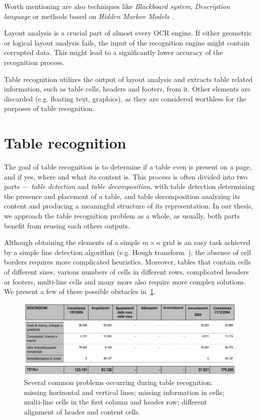 Worth mentioning are also techniques like \emph{Blackboard system}, \emph{Description language} or methods based on \emph{Hidden Markov Models}~\cite{logicalLayoutOther}.

Layout analysis is a crucial part of almost every OCR engine. If either geometric or logical layout analysis fails, the input of the recognition engine might contain corrupted data. This might lead to a significantly lower accuracy of the recognition process. 

Table recognition utilizes the output of layout analysis and extracts table related information, such as table cells, headers and footers, from it. Other elements are discarded (e.g. floating text, graphics), as they are considered worthless for the purposes of table recognition.

\section{Table recognition}

The goal of table recognition is to determine if a table even is present on a page, and if yes, where and what its content is. This process is often divided into two parts --- \emph{table detection} and \emph{table decomposition}, with table detection determining the presence and placement of a table, and table decomposition analyzing its content and producing a meaningful structure of its representation. In our thesis, we approach the table recognition problem as a whole, as usually, both parts benefit from reusing each others outputs.

Although obtaining the elements of a simple $m{\times}n$ grid is an easy task achieved by a simple line detection algorithm (e.g. Hough transform~\cite{houghTransform}), the absence of cell borders requires more complicated heuristics. Moreover, tables that contain cells of different sizes, various numbers of cells in different rows, complicated headers or footers, multi-line cells and many more also require more complex solutions. We present a few of these possible obstacles in~\cref{fig:tableRecognitionObstacles}.

\begin{figure}[t]
\centering
\includegraphics[width=0.7\linewidth]{img/tableDetection/recognitionProblematic.jpg}
\caption{Several common problems occurring during table recognition: missing horizontal and vertical lines; missing information in cells; multi-line cells in the first column and header row; different alignment of header and content cells.}
\label{fig:tableRecognitionObstacles}
\end{figure}

